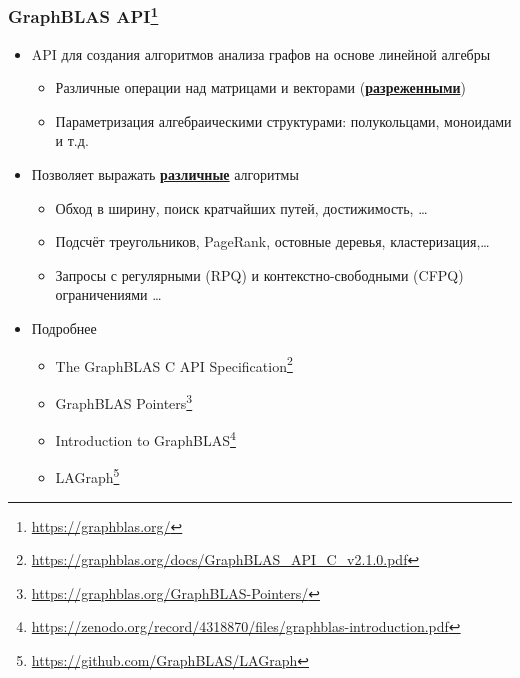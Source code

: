 \documentclass[xcolor=table,aspectratio=169]{beamer}
\begin{document}
\begin{frame}[fragile]
  \frametitle{GraphBLAS API\footnote{\url{https://graphblas.org/}}}
  \begin{itemize}
    \item API для создания алгоритмов анализа графов на основе линейной алгебры 
    \begin{itemize}
      \item Различные операции над матрицами и векторами (\underline{\textbf{разреженными}})
      \item Параметризация алгебраическими структурами: полукольцами, моноидами и т.д.
    \end{itemize}
    \item Позволяет выражать \underline{\textbf{различные}} алгоритмы
    \begin{itemize}
      \item Обход в ширину, поиск кратчайших путей, достижимость, \ldots
      \item Подсчёт треугольников, PageRank, остовные деревья, кластеризация,\ldots
      \item Запросы с регулярными (RPQ) и контекстно-свободными (CFPQ) ограничениями \ldots      
    \end{itemize}
    \item Подробнее
    
    \begin{itemize}
      \item The GraphBLAS C API Specification\footnote{\url{https://graphblas.org/docs/GraphBLAS_API_C_v2.1.0.pdf}}
      \item GraphBLAS Pointers\footnote{\url{https://graphblas.org/GraphBLAS-Pointers/}}
      \item Introduction to GraphBLAS\footnote{\url{https://zenodo.org/record/4318870/files/graphblas-introduction.pdf}}
      \item LAGraph\footnote{\url{https://github.com/GraphBLAS/LAGraph}}
    \end{itemize}
  
    \end{itemize}
\end{frame}
\end{document}
